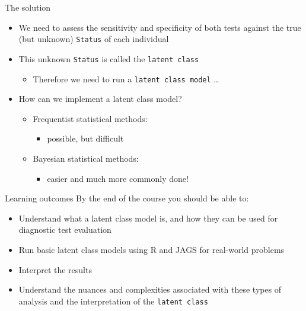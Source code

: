 \documentclass[
  ignorenonframetext,
  aspectratio=169,
]{beamer}
\providecommand{\tightlist}{%
  \setlength{\itemsep}{0pt}\setlength{\parskip}{0pt}}
\begin{document}
\begin{frame}[fragile]{The solution}
\protect\hypertarget{the-solution}{}
\begin{itemize}
\item
  We need to assess the sensitivity and specificity of both tests
  against the true (but unknown) \texttt{Status} of each individual
\item
  This unknown \texttt{Status} is called the \texttt{latent\ class}

  \begin{itemize}
  \tightlist
  \item
    Therefore we need to run a \texttt{latent\ class\ model} \ldots{}
  \end{itemize}
\end{itemize}

\pause

\begin{itemize}
\tightlist
\item
  How can we implement a latent class model?

  \begin{itemize}
  \tightlist
  \item
    Frequentist statistical methods:

    \begin{itemize}
    \tightlist
    \item
      possible, but difficult
    \end{itemize}
  \item
    Bayesian statistical methods:

    \begin{itemize}
    \tightlist
    \item
      easier and much more commonly done!
    \end{itemize}
  \end{itemize}
\end{itemize}
\end{frame}

\begin{frame}[fragile]{Learning outcomes}
\protect\hypertarget{learning-outcomes}{}
By the end of the course you should be able to:

\begin{itemize}
\item
  Understand what a latent class model is, and how they can be used for
  diagnostic test evaluation
\item
  Run basic latent class models using R and JAGS for real-world problems
\item
  Interpret the results
\item
  Understand the nuances and complexities associated with these types of
  analysis and the interpretation of the \texttt{latent\ class}
\end{itemize}
\end{frame}
\end{document}
